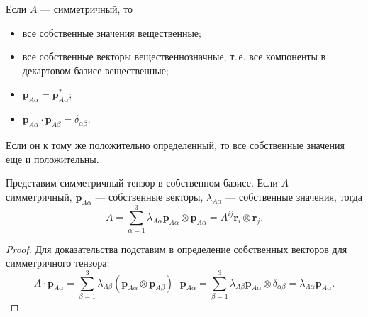 \begin{corollary}
	Если $A$ --- симметричный, то
  \begin{itemize}[label=--]
		\item все собственные значения вещественные;
    \item все собственные векторы вещественнозначные, т.\,е. все компоненты в
      декартовом базисе
		вещественные;
		\item $\mathbf{p}_{A\alpha} = \mathbf{p}^*_{A\alpha}$;
		\item $\mathbf{p}_{A\alpha} \cdot \mathbf{p}_{A\beta} = \delta_{\alpha\beta}.$
	\end{itemize}
	
	Если он к тому же положительно определенный, то все собственные значения еще и положительны.
\end{corollary}
\begin{corollary}
	Представим симметричный тензор в собственном базисе. Если $A$ --- симметричный,
	$\mathbf{p}_{A\alpha}$ --- собственные векторы, $\lambda_{A\alpha}$ --- собственные значения,
	тогда
	\[
	A = \sum_{\alpha=1}^3 \lambda_{A\alpha} \mathbf{p}_{A\alpha} \otimes \mathbf{p}_{A\alpha}
	= A^{ij} \mathbf{r}_i \otimes \mathbf{r}_j.
	\]
	\begin{proof}
		Для доказательства подставим в определение собственных векторов для симметричного тензора:
		\[
		A \cdot \mathbf{p}_{A\alpha}
		= \sum_{\beta=1}^3 \lambda_{A\beta} (\mathbf{p}_{A\alpha}\otimes \mathbf{p}_{A\beta}) \cdot \mathbf{p}_{A\alpha}
		= \sum_{\beta=1}^3 \lambda_{A\beta} \mathbf{p}_{A\alpha} \otimes \delta_{\alpha\beta}
		= \lambda_{A\alpha} \mathbf{p}_{A\alpha}.
		\]
	\end{proof}
\end{corollary}


